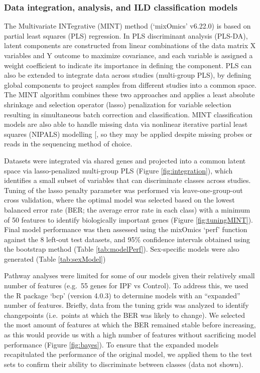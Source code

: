 \documentclass[
]{article}
\begin{document}
\subsubsection{Data integration, analysis, and ILD classification models}\label{data}

The Multivariate INTegrative (MINT) method (`mixOmics' v6.22.0) is based on partial least squares (PLS) regression. In PLS discriminant analysis (PLS-DA), latent components are constructed from linear combinations of the data matrix X variables and Y outcome to maximize covariance, and each variable is assigned a weight coefficient to indicate its importance in defining the component. PLS can also be extended to integrate data across studies (multi-group PLS), by defining global components to project samples from different studies into a common space. The MINT algorithm combines these two approaches and applies a least absolute shrinkage and selection operator (lasso) penalization for variable selection resulting in simultaneous batch correction and classification. MINT classification models are also able to handle missing data via nonlinear iterative partial least squares (NIPALS) modelling {[}\citeproc{ref-wold_nonlinear_1973}{189}{]}, so they may be applied despite missing probes or reads in the sequencing method of choice.

Datasets were integrated via shared genes and projected into a common latent space via lasso-penalized multi-group PLS (Figure \ref{fig:integration}), which identifies a small subset of variables that can discriminate classes across studies. Tuning of the lasso penalty parameter was performed via leave-one-group-out cross validation, where the optimal model was selected based on the lowest balanced error rate (BER; the average error rate in each class) with a minimum of 50 features to identify biologically important genes (Figure \ref{fig:tuningMINT}). Final model performance was then assessed using the mixOmics `perf' function against the 8 left-out test datasets, and 95\% confidence intervals obtained using the bootstrap method (Table \ref{tab:modelPerf}). Sex-specific models were also generated (Table \ref{tab:sexModel})

Pathway analyses were limited for some of our models given their relatively small number of features (e.g.~55 genes for IPF vs Control). To address this, we used the R package `bcp' (version 4.0.3) to determine models with an ``expanded'' number of features. Briefly, data from the tuning grids was analyzed to identify changepoints (i.e.~points at which the BER was likely to change). We selected the most amount of features at which the BER remained stable before increasing, as this would provide us with a high number of features without sacrificing model performance (Figure \ref{fig:bayes}). To ensure that the expanded models recapitulated the performance of the original model, we applied them to the test sets to confirm their ability to discriminate between classes (data not shown).
\end{document}
